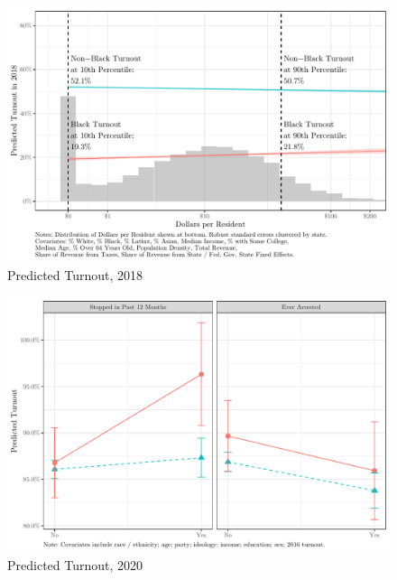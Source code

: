 \documentclass[
  12pt,
]{article}
\begin{document}
\begin{figure}[H]

{\centering \includegraphics{not_blind_files/figure-latex/cross-18-1} 

}

\caption{\label{fig:mef-2018}Predicted Turnout, 2018}\label{fig:cross-18}
\end{figure}

\begin{figure}[!htpb]

{\centering \includegraphics{not_blind_files/figure-latex/anes-cross-1} 

}

\caption{\label{fig:anes}Predicted Turnout, 2020}\label{fig:anes-cross}
\end{figure}
\end{document}
